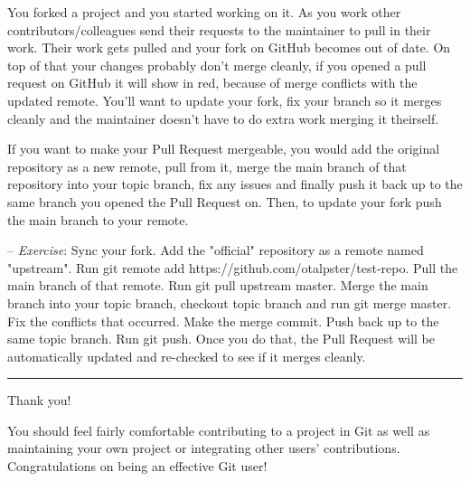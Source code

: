 \documentclass[12pt,a4]{article}
\newcommand{\ilcode}[1]{\textcolor[RGB]{160, 110, 220}{#1}}
\begin{document}
You forked a project and you started working on it. As you work other
contributors/colleagues send their requests to the maintainer to pull in their
work. Their work gets pulled and your fork on GitHub becomes out of date. On top
of that your changes probably don't merge cleanly, if you opened a pull request
on GitHub it will show in red, because of merge conflicts with the updated
remote. You'll want to update your fork, fix your branch so it merges cleanly
and the maintainer doesn't have to do extra work merging it theirself.

If you want to make your Pull Request mergeable, you would add the original
repository as a new remote, pull from it, merge the main branch of that
repository into your topic branch, fix any issues and finally push it back up to
the same branch you opened the Pull Request on. Then, to update your fork push
the main branch to your remote.

{\sf -- \emph{Exercise}:} Sync your fork. Add the "official" repository as a
remote named "upstream". Run \ilcode{git remote add
https://github.com/otalpster/test-repo}. Pull the main branch of that remote.
Run \ilcode{git pull upstream master}. Merge the main branch into your topic
branch, checkout topic branch and run \ilcode{git merge master}. Fix the
conflicts that occurred. Make the merge commit. Push back up to the same topic
branch. Run \ilcode{git push}. Once you do that, the Pull Request will be
automatically updated and re-checked to see if it merges cleanly.

\textcolor[RGB]{220,220,220}{\rule{\linewidth}{0.8pt}}

\begin{center}
	\Huge
	{\sf Thank you!}
\end{center}

You should feel fairly comfortable contributing to a project in Git as well as
maintaining your own project or integrating other users' contributions.
Congratulations on being an effective Git user!
\end{document}
